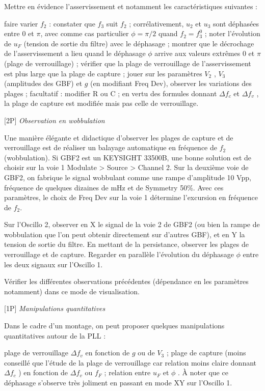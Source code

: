 \documentclass{article}%
\begin{document}
Mettre en évidence l'asservissement et notamment les caractéristiques suivantes :

    faire varier $f_2$ : constater que $f_3$ suit $f_2$ ;
    corrélativement, $u_2$ et $u_3$ sont déphasées entre 0 et $\pi$, avec comme cas particulier $\phi =\pi/2$ quand $f_2 = f_{3}^0$ ;
    noter l'évolution de $u_F$ (tension de sortie du filtre) avec le déphasage ;
    montrer que le décrochage de l'asservissement a lieu quand le déphasage $\phi$ arrive aux valeurs extrêmes 0 et $\pi$ (plage de verrouillage) ;
    vérifier que la plage de verrouillage de l'asservissement est plus large que la plage de capture ;
    jouer sur les paramètres $V_2$ , $V_3$ (amplitudes des GBF) et $g$ (en modifiant Freq Dev), observer les variations des plages ;
    facultatif : modifier R ou C ; en vertu des formules donnant $\Delta f_c$ et $\Delta f_v$ , la plage de capture est modifiée mais pas celle de verrouillage.

    [2P] \textit{Observation en wobbulation}

Une manière élégante et didactique d'observer les plages de capture et de verrouillage est de réaliser un balayage automatique en fréquence de $f_2$ (wobbulation). Si GBF2 est un KEYSIGHT 33500B, une bonne solution est de choisir sur la voie 1 Modulate > Source > Channel 2. Sur la deuxième voie de GBF2, on fabrique le signal wobbulant comme une rampe d'amplitude 10 Vpp, fréquence de quelques dizaines de mHz et de Symmetry 50\%. Avec ces paramètres, le choix de Freq Dev sur la voie 1 détermine l'excursion en fréquence de $f_2$.

    Sur l'Oscillo 2, observer en X le signal de la voie 2 de GBF2 (ou bien la rampe de wobbulation que l'on peut obtenir directement sur d'autres GBF), et en Y la tension de sortie du filtre. En mettant de la persistance, observer les plages de verrouillage et de capture. Regarder en parallèle l'évolution du déphasage $\phi$ entre les deux signaux sur l'Oscillo 1.

    Vérifier les différentes observations précédentes (dépendance en les paramètres notamment) dans ce mode de visualisation.

    [1P] \textit{Manipulations quantitatives}

Dans le cadre d'un montage, on peut proposer quelques manipulations quantitatives autour de la PLL :

    plage de verrouillage $\Delta f_v$ en fonction de $g$ ou de $V_3$  ;
    plage de capture (moins conseillé que l'étude de la plage de verrouillage car relation moins claire donnant $\Delta f_c$ ) en fonction de $\Delta f_v$ ou $f_F$  ;
    relation entre $u_F$ et $ \phi$ . À noter que ce déphasage s'observe très joliment en passant en mode XY sur l'Oscillo 1.
\end{document}

